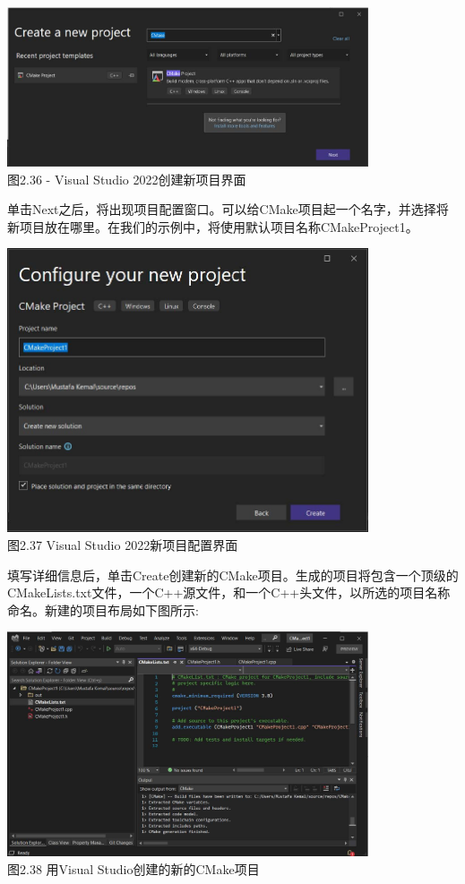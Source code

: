 \begin{center}
\includegraphics[width=0.8\textwidth]{content/1/chapter2/images/36.jpg}\\
图2.36 - Visual Studio 2022创建新项目界面
\end{center}

单击Next之后，将出现项目配置窗口。可以给CMake项目起一个名字，并选择将新项目放在哪里。在我们的示例中，将使用默认项目名称CMakeProject1。

\begin{center}
\includegraphics[width=0.8\textwidth]{content/1/chapter2/images/37.jpg}\\
图2.37  Visual Studio 2022新项目配置界面
\end{center}

填写详细信息后，单击Create创建新的CMake项目。生成的项目将包含一个顶级的CMakeLists.txt文件，一个C++源文件，和一个C++头文件，以所选的项目名称命名。新建的项目布局如下图所示:

\begin{center}
\includegraphics[width=0.8\textwidth]{content/1/chapter2/images/38.jpg}\\
图2.38 用Visual Studio创建的新的CMake项目
\end{center}

